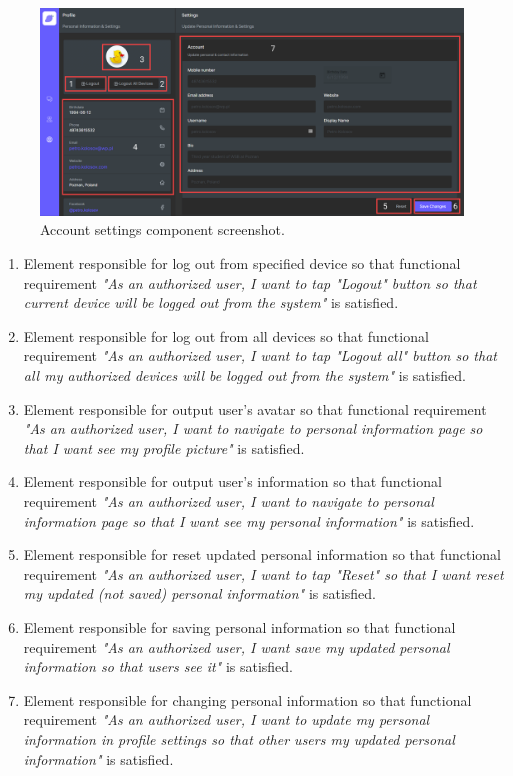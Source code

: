 \begin{figure}[H]
    \centering
    \includegraphics[width=1\textwidth]{Pictures/11_Messenger_account_settings}
    \caption{Account settings component screenshot.}\label{fig:figure11}
\end{figure}
\begin{enumerate}
    \item Element responsible for log out from specified device so that functional requirement
    \textit{"As an authorized user, I want to tap "Logout" button so that current device
    will be logged out from the system"} is satisfied.
    \item Element responsible for log out from all devices so that functional requirement
    \textit{"As an authorized user, I want to tap "Logout all" button so that all my authorized devices will be
    logged out from the system"} is satisfied.
    \item Element responsible for output user's avatar so that functional requirement
    \textit{"As an authorized user, I want to navigate to personal information page so that
    I want see my profile picture"} is satisfied.
    \item Element responsible for output user's information so that functional requirement
    \textit{"As an authorized user, I want to navigate to personal information page so that I want see my
    personal information"} is satisfied.
    \item Element responsible for reset updated personal information so that functional requirement
    \textit{"As an authorized user, I want to tap "Reset" so that I want reset my updated (not saved)
        personal information"} is satisfied.
    \item Element responsible for saving personal information so that functional requirement
    \textit{"As an authorized user, I want save my updated personal information so that users see it"}
    is satisfied.
    \item Element responsible for changing personal information so that functional requirement
    \textit{"As an authorized user, I want to update my personal information in profile settings so that other users
    my updated personal information"} is satisfied.
\end{enumerate}